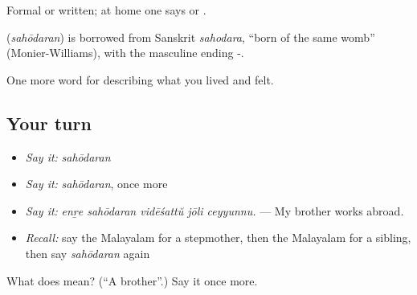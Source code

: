 Formal or written; at home one says  or .

\begin{cousinweb}
\textbf{} (\emph{sahōdaran}) is borrowed from Sanskrit \emph{sahodara}, \textquotedblleft{}born of the same womb\textquotedblright{} (Monier-Williams), with the masculine ending -.
\end{cousinweb}

\begin{grammarlens}[title={What you've built}]
One more word for describing what you lived and felt.
\end{grammarlens}

\subsection*{Your turn}
\begin{itemize}
\raggedright
  \item \emph{Say it:} \emph{sahōdaran}
  \item \emph{Say it:} \emph{sahōdaran}, once more
  \item \emph{Say it:} \emph{enṟe sahōdaran vidēśattŭ jōli ceyyunnu.} — My brother works abroad.
  \item \emph{Recall:} say the Malayalam for a stepmother, then the Malayalam for a sibling, then say \emph{sahōdaran} again
\end{itemize}

\begin{tcolorbox}[breakable,colback=teal!4,colframe=teal!35!black,title={Before you move on}]
What does  mean? (\textquotedblleft{}A brother\textquotedblright{}.) Say it once more.
\end{tcolorbox}
